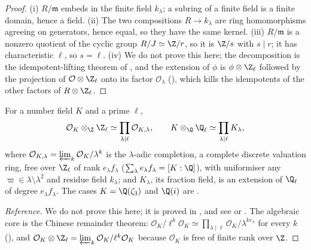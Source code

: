 \begin{proof}
(i) $R/\mathfrak m$ embeds in the finite field $k_\lambda$; a subring of a finite field is a finite domain, hence a field. (ii) The two compositions
$R\to k_\lambda$ are ring homomorphisms agreeing on generators, hence equal, so they have the same kernel. (iii) $R/\mathfrak m$ is a nonzero quotient of the
cyclic group $R/J\simeq\Z/r$, so it is $\Z/s$ with $s\mid r$; it has characteristic $\ell$, so $s=\ell$. (iv) We do not prove this here; the decomposition
is the idempotent-lifting theorem of , and the extension of $\phi$ is $\phi\otimes\Z_\ell$ followed by the projection of
$\mathcal O\otimes\Z_\ell$ onto its factor $\mathcal O_\lambda$ (), which kills the idempotents of the other factors of $R\otimes\Z_\ell$.
\end{proof}

\begin{proposition}\label{prop:ant:otimesZl}
For a number field $K$ and a prime $\ell$,
\[
\mathcal O_K\otimes_\Z\Z_\ell\simeq\prod_{\lambda\mid\ell}\mathcal O_{K,\lambda},\qquad K\otimes_\Q\Q_\ell\simeq\prod_{\lambda\mid\ell}K_\lambda,
\]
where $\mathcal O_{K,\lambda}=\varprojlim_k\mathcal O_K/\lambda^k$ is the $\lambda$-adic completion, a complete discrete valuation ring, free over $\Z_\ell$ of rank $e_\lambda f_\lambda$
($\sum_\lambda e_\lambda f_\lambda=[K:\Q]$), with uniformiser any $\varpi\in\lambda\setminus\lambda^2$ and residue field $k_\lambda$; and $K_\lambda$, its fraction field, is
an extension of $\Q_\ell$ of degree $e_\lambda f_\lambda$. The cases $K=\Q(\zeta_3)$ and $\Q(i)$ are .
\end{proposition}

\begin{proof}[Reference]
We do not prove this here; it is proved in , and see \cite[Chapter II, Section 8]{Neukirch} or \cite[Chapter II]{SerreLocalFields}. The
algebraic core is the Chinese remainder theorem: $\mathcal O_K/\ell^k\mathcal O_K\simeq\prod_{\lambda\mid\ell}\mathcal O_K/\lambda^{ke_\lambda}$ for every $k$ (), and
$\mathcal O_K\otimes\Z_\ell=\varprojlim_k\mathcal O_K/\ell^k\mathcal O_K$ because $\mathcal O_K$ is free of finite rank over $\Z$.
\end{proof}

